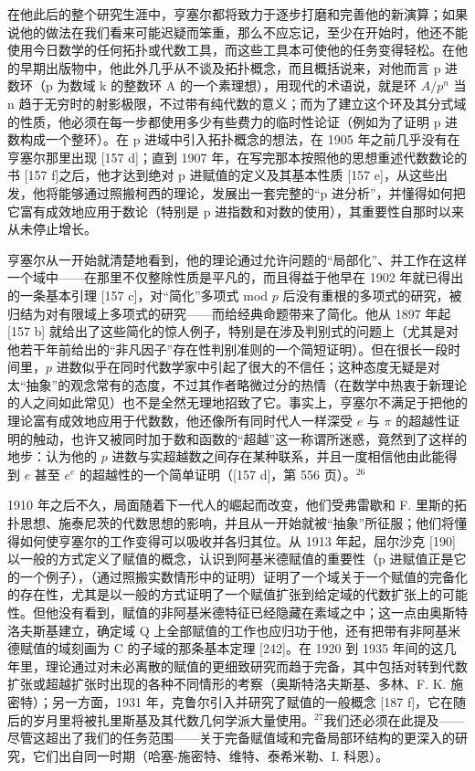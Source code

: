 在他此后的整个研究生涯中，亨塞尔都将致力于逐步打磨和完善他的新演算；如果说他的做法在我们看来可能迟疑而笨重，那么不应忘记，至少在开始时，他还不能使用今日数学的任何拓扑或代数工具，而这些工具本可使他的任务变得轻松。在他的早期出版物中，他此外几乎从不谈及拓扑概念，而且概括说来，对他而言 p 进数环（p 为数域 k 的整数环 A 的一个素理想），用现代的术语说，就是环 \(A/p^{n}\) 当 n 趋于无穷时的射影极限，不过带有纯代数的意义；而为了建立这个环及其分式域的性质，他必须在每一步都使用多少有些费力的临时性论证（例如为了证明 p 进数构成一个整环）。在 p 进域中引入拓扑概念的想法，在 1905 年之前几乎没有在亨塞尔那里出现 {[}157 d{]}；直到 1907 年，在写完那本按照他的思想重述代数数论的书 {[}157 f{]}之后，他才达到绝对 p 进赋值的定义及其基本性质 {[}157 e{]}，从这些出发，他将能够通过照搬柯西的理论，发展出一套完整的“p 进分析”，并懂得如何把它富有成效地应用于数论（特别是 p 进指数和对数的使用），其重要性自那时以来从未停止增长。

亨塞尔从一开始就清楚地看到，他的理论通过允许问题的“局部化”、并工作在这样一个域中——在那里不仅整除性质是平凡的，而且得益于他早在 1902 年就已得出的一条基本引理 {[}157 c{]}，对“简化”多项式 mod \(p\) 后没有重根的多项式的研究，被归结为对有限域上多项式的研究——而给经典命题带来了简化。他从 1897 年起 {[}157 b{]} 就给出了这些简化的惊人例子，特别是在涉及判别式的问题上（尤其是对他若干年前给出的“非凡因子”存在性判别准则的一个简短证明）。但在很长一段时间里，\(p\) 进数似乎在同时代数学家中引起了很大的不信任；这种态度无疑是对太“抽象”的观念常有的态度，不过其作者略微过分的热情（在数学中热衷于新理论的人之间如此常见）也不是全然无理地招致了它。事实上，亨塞尔不满足于把他的理论富有成效地应用于代数数，他还像所有同时代人一样深受 \(e\) 与 \(\pi\) 的超越性证明的触动，也许又被同时加于数和函数的“超越”这一称谓所迷惑，竟然到了这样的地步：认为他的 \(p\) 进数与实超越数之间存在某种联系，并且一度相信他由此能得到 \(e\) 甚至 \(e^e\) 的超越性的一个简单证明（{[}157 d{]}，第 556 页）。\(^{26}\)

1910 年之后不久，局面随着下一代人的崛起而改变，他们受弗雷歇和 F. 里斯的拓扑思想、施泰尼茨的代数思想的影响，并且从一开始就被“抽象”所征服；他们将懂得如何使亨塞尔的工作变得可以吸收并各归其位。从 1913 年起，屈尔沙克 {[}190{]} 以一般的方式定义了赋值的概念，认识到阿基米德赋值的重要性（p 进赋值正是它的一个例子），（通过照搬实数情形中的证明）证明了一个域关于一个赋值的完备化的存在性，尤其是以一般的方式证明了一个赋值扩张到给定域的代数扩张上的可能性。但他没有看到，赋值的非阿基米德特征已经隐藏在素域之中；这一点由奥斯特洛夫斯基建立，确定域 Q 上全部赋值的工作也应归功于他，还有把带有非阿基米德赋值的域刻画为 C 的子域的那条基本定理 {[}242{]}。在 1920 到 1935 年间的这几年里，理论通过对未必离散的赋值的更细致研究而趋于完备，其中包括对转到代数扩张或超越扩张时出现的各种不同情形的考察（奥斯特洛夫斯基、多林、F. K. 施密特）；另一方面，1931 年，克鲁尔引入并研究了赋值的一般概念 {[}187 f{]}，它在随后的岁月里将被扎里斯基及其代数几何学派大量使用。\(^{27}\)我们还必须在此提及——尽管这超出了我们的任务范围——关于完备赋值域和完备局部环结构的更深入的研究，它们出自同一时期（哈塞-施密特、维特、泰希米勒、I. 科恩）。

